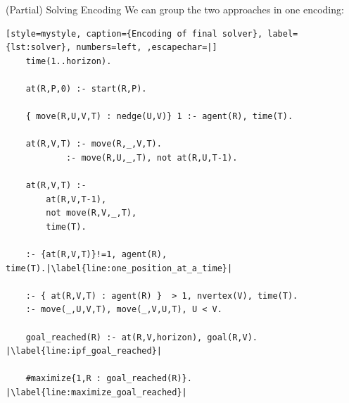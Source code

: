 \begin{frame}[fragile]{(Partial) Solving Encoding}
    We can group the two approaches in one encoding:
    \begin{lstlisting}[style=mystyle, caption={Encoding of final solver}, label={lst:solver}, numbers=left, ,escapechar=|]
    time(1..horizon).

    at(R,P,0) :- start(R,P).

    { move(R,U,V,T) : nedge(U,V)} 1 :- agent(R), time(T).

    at(R,V,T) :- move(R,_,V,T).
            :- move(R,U,_,T), not at(R,U,T-1).

    at(R,V,T) :- 
        at(R,V,T-1), 
        not move(R,V,_,T), 
        time(T).

    :- {at(R,V,T)}!=1, agent(R), time(T).|\label{line:one_position_at_a_time}|

    :- { at(R,V,T) : agent(R) }  > 1, nvertex(V), time(T).
    :- move(_,U,V,T), move(_,V,U,T), U < V.

    goal_reached(R) :- at(R,V,horizon), goal(R,V). |\label{line:ipf_goal_reached}|

    #maximize{1,R : goal_reached(R)}. |\label{line:maximize_goal_reached}|
\end{lstlisting}
\end{frame}
